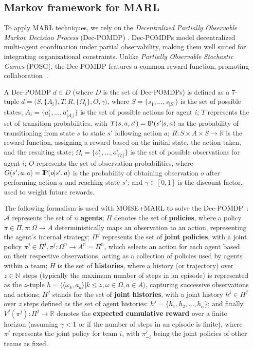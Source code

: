 \documentclass[pdflatex,sn-mathphys-num]{sn-jnl}%
\newcommand{\probP}{\text{I\kern-0.15em P}}
\theoremstyle{thmstyleone}%
\theoremstyle{thmstyletwo}%
\theoremstyle{thmstylethree}%
\begin{document}
\subsection{Markov framework for MARL}

To apply MARL techniques, we rely on the \textit{Decentralized Partially Observable Markov Decision Process} (Dec-POMDP) \cite{Oliehoek2016}. Dec-POMDPs model decentralized multi-agent coordination under partial observability, making them well suited for integrating organizational constraints. Unlike \textit{Partially Observable Stochastic Games} (POSG), the Dec-POMDP features a common reward function, promoting collaboration~\cite{Beynier2013}.

A Dec-POMDP $d \in D$ (where $D$ is the set of Dec-POMDPs) is defined as a 7-tuple $d = \langle S, \{A_i\}, T, R, \{\Omega_i\}, O, \gamma \rangle$, where $S = \{s_1,\dots,s_{|S|}\}$ is the set of possible states; $A_{i} = \{a_{1}^{i},\dots,a_{|A_{i}|}^{i}\}$ is the set of possible actions for agent $i$; $T$ represents the set of transition probabilities, with $T(s,a,s') = \probP(s'|s,a)$ as the probability of transitioning from state $s$ to state $s'$ following action $a$; $R: S \times A \times S \rightarrow \mathbb{R}$ is the reward function, assigning a reward based on the initial state, the action taken, and the resulting state; $\Omega_{i} = \{o_{1}^{i},\dots,o_{|\Omega_{i}|}^{i}\}$ is the set of possible observations for agent $i$; $O$ represents the set of observation probabilities, where $O(s',a,o) = \probP(o|s',a)$ is the probability of obtaining observation $o$ after performing action $a$ and reaching state $s'$; and $\gamma \in [0,1]$ is the discount factor, used to weight future rewards.

The following formalism is used with MOISE+MARL to solve the Dec-POMDP~\cite{Beynier2013,Albrecht2024}: $\mathcal{A}$ represents the set of $n$ \textbf{agents}; $\Pi$ denotes the set of \textbf{policies}, where a policy $\pi \in \Pi, \pi: \Omega \rightarrow A$ deterministically maps an observation to an action, representing the agent's internal strategy; $\Pi^{j}$ represents the set of \textbf{joint policies}, with a joint policy $\pi^{j} \in \Pi^{j}, \pi^{j}: \Omega^n \rightarrow A^n = \Pi^n$, which selects an action for each agent based on their respective observations, acting as a collection of policies used by agents within a team; $H$ is the set of \textbf{histories}, where a history (or trajectory) over $z \in \mathbb{N}$ steps (typically the maximum number of steps in an episode) is represented as the $z$-tuple $h = \langle \langle \omega_{k}, a_{k}\rangle | k \leq z, \omega \in \Omega, a \in A\rangle$, capturing successive observations and actions; $H^{j}$ stands for the set of \textbf{joint histories}, with a joint history $h^{j} \in H^{j}$ over $z$ steps defined as the set of agent histories: $h^{j} = \{h_1, h_2, \dots, h_n\}$; and finally, $V^{j}(\pi^{j}): \Pi^{j} \rightarrow \mathbb{R}$ denotes the \textbf{expected cumulative reward} over a finite horizon (assuming $\gamma < 1$ or if the number of steps in an episode is finite), where $\pi^{j}$ represents the joint policy for team $i$, with $\pi^{j}_{-i}$ being the joint policies of other teams as fixed.
\end{document}
